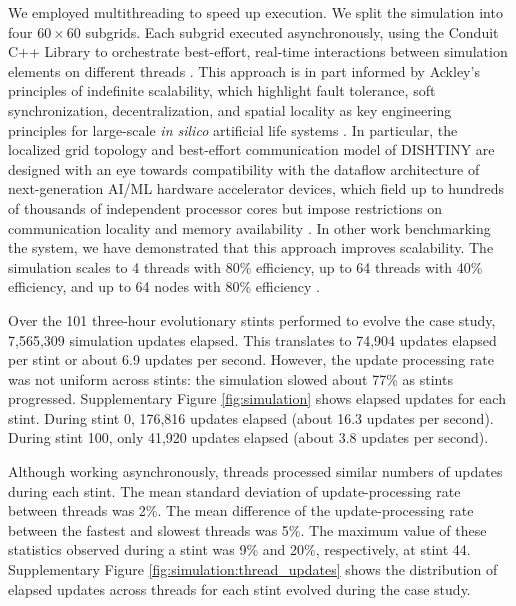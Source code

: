 We employed multithreading to speed up execution.
We split the simulation into four $60\times60$ subgrids.
Each subgrid executed asynchronously, using the Conduit C++ Library  to orchestrate best-effort, real-time interactions between simulation elements on different threads .
This approach is in part informed by Ackley's principles of indefinite scalability, which highlight fault tolerance, soft synchronization, decentralization, and spatial locality as key engineering principles for large-scale \textit{in silico} artificial life systems \citep{ackley2014indefinitely,ackley2023robust}.
In particular, the localized grid topology and best-effort communication model of DISHTINY are designed with an eye towards compatibility with the dataflow architecture of next-generation AI/ML hardware accelerator devices, which field up to hundreds of thousands of independent processor cores but impose restrictions on communication locality and memory availability \citep{lauterbach2021path,moreno2024trackable}.
In other work benchmarking the system, we have demonstrated that this approach improves scalability.
The simulation scales to 4 threads with 80\% efficiency, up to 64 threads with 40\% efficiency, and up to 64 nodes with 80\% efficiency .

Over the 101 three-hour evolutionary stints performed to evolve the case study, 7,565,309 simulation updates elapsed.
This translates to 74,904 updates elapsed per stint or about 6.9 updates per second.
However, the update processing rate was not uniform across stints: the simulation slowed about 77\% as stints progressed.
Supplementary Figure \ref{fig:simulation} shows elapsed updates for each stint.
During stint 0, 176,816 updates elapsed (about 16.3 updates per second).
During stint 100, only 41,920 updates elapsed (about 3.8 updates per second).

Although working asynchronously, threads processed similar numbers of updates during each stint.
The mean standard deviation of update-processing rate between threads was 2\%.
The mean difference of the update-processing rate between the fastest and slowest threads was 5\%.
The maximum value of these statistics observed during a stint was 9\% and 20\%, respectively, at stint 44.
Supplementary Figure \ref{fig:simulation:thread_updates} shows the distribution of elapsed updates across threads for each stint evolved during the case study.
